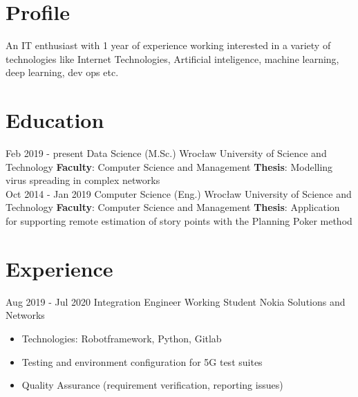 \documentclass[letterpaper]{tenseconds} %
\begin{document}
\makeprofile %

\section{Profile}
\textnormal An IT enthusiast with 1 year of experience working interested in a variety of technologies like Internet Technologies, Artificial inteligence, machine learning, deep learning, dev ops etc.

\section{Education}
\begin{twenty} %
	\twentyitem
	{Feb 2019 -}
	{present}
	{Data Science (M.Sc.)}
	{}
	{Wrocław University of Science and Technology \href{https://pwr.edu.pl/}{\faExternalLink}}
	{
		\textbf{Faculty}: Computer Science and Management \href{https://wiz.pwr.edu.pl/}{\faExternalLink}\newline
		\textbf{Thesis}: Modelling virus spreading in complex networks
	}
	{}
	{}
	\\
	\twentyitem
	{Oct 2014 -}
	{Jan 2019}
	{Computer Science (Eng.)}
	{}
	{Wrocław University of Science and Technology \href{https://pwr.edu.pl/}{\faExternalLink}}
	{
		\textbf{Faculty}: Computer Science and Management \href{https://wiz.pwr.edu.pl/}{\faExternalLink}\newline
		\textbf{Thesis}:  Application for supporting remote estimation of story points with the Planning Poker method
	}
	{}
	{}
\end{twenty}

\section{Experience}
\begin{twenty} %
	\twentyitem
	{Aug 2019 -}
	{Jul 2020}
	{Integration Engineer}
	{Working Student}
	{Nokia Solutions and Networks \href{https://www.nokia.com/}{\faExternalLink}}
	{\begin{itemize}
			\item Technologies: Robotframework, Python, Gitlab
			\item Testing and environment configuration for 5G test suites
			\item Quality Assurance (requirement verification, reporting issues)
		\end{itemize}}
\end{twenty}
\end{document}
